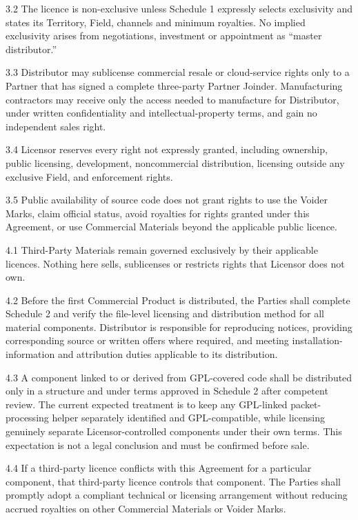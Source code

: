 \documentclass[11pt,a4paper]{article}
\newcommand{\articleheading}[2]{%
  \par\medskip{\large\bfseries\color{voiderblue}#1\quad #2}\par\smallskip
}
\begin{document}
3.2 The licence is non-exclusive unless Schedule 1 expressly selects exclusivity and states its Territory, Field, channels and minimum royalties. No implied exclusivity arises from negotiations, investment or appointment as ``master distributor.''

3.3 Distributor may sublicense commercial resale or cloud-service rights only to a Partner that has signed a complete three-party Partner Joinder. Manufacturing contractors may receive only the access needed to manufacture for Distributor, under written confidentiality and intellectual-property terms, and gain no independent sales right.

3.4 Licensor reserves every right not expressly granted, including ownership, public licensing, development, noncommercial distribution, licensing outside any exclusive Field, and enforcement rights.

3.5 Public availability of source code does not grant rights to use the Voider Marks, claim official status, avoid royalties for rights granted under this Agreement, or use Commercial Materials beyond the applicable public licence.

\articleheading{4.}{Third-party and open-source materials}

4.1 Third-Party Materials remain governed exclusively by their applicable licences. Nothing here sells, sublicenses or restricts rights that Licensor does not own.

4.2 Before the first Commercial Product is distributed, the Parties shall complete Schedule 2 and verify the file-level licensing and distribution method for all material components. Distributor is responsible for reproducing notices, providing corresponding source or written offers where required, and meeting installation-information and attribution duties applicable to its distribution.

4.3 A component linked to or derived from GPL-covered code shall be distributed only in a structure and under terms approved in Schedule 2 after competent review. The current expected treatment is to keep any GPL-linked packet-processing helper separately identified and GPL-compatible, while licensing genuinely separate Licensor-controlled components under their own terms. This expectation is not a legal conclusion and must be confirmed before sale.

4.4 If a third-party licence conflicts with this Agreement for a particular component, that third-party licence controls that component. The Parties shall promptly adopt a compliant technical or licensing arrangement without reducing accrued royalties on other Commercial Materials or Voider Marks.
\end{document}
